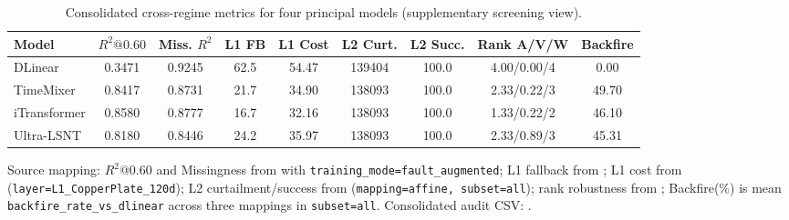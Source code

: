 ﻿\documentclass[review,1p,times]{elsarticle}
\begin{document}
\begin{table}[t]
\centering
\caption{Consolidated cross-regime metrics for four principal models (supplementary screening view).}
\label{tab:supp_decision_aware_robustness_summary}
\begingroup
\setlength{\tabcolsep}{3pt}
\scriptsize
\begin{tabular*}{\linewidth}{@{\extracolsep{\fill}}lcccccccc@{}}
\toprule
\textbf{Model} & \textbf{$R^2@0.60$} & \textbf{Miss. $R^2$} & \textbf{L1 FB} & \textbf{L1 Cost} & \textbf{L2 Curt.} & \textbf{L2 Succ.} & \textbf{Rank A/V/W} & \textbf{Backfire} \\
\midrule
DLinear & 0.3471 & 0.9245 & 62.5 & 54.47 & 139404 & 100.0 & 4.00/0.00/4 & 0.00 \\
TimeMixer & 0.8417 & 0.8731 & 21.7 & 34.90 & 138093 & 100.0 & 2.33/0.22/3 & 49.70 \\
iTransformer & 0.8580 & 0.8777 & 16.7 & 32.16 & 138093 & 100.0 & 1.33/0.22/2 & 46.10 \\
Ultra-LSNT & 0.8180 & 0.8446 & 24.2 & 35.97 & 138093 & 100.0 & 2.33/0.89/3 & 45.31 \\
\bottomrule
\end{tabular*}
\vspace{3pt}
\footnotesize Source mapping: $R^2@0.60$ and Missingness from  with \texttt{training\_mode=fault\_augmented}; L1 fallback from ; L1 cost from  (\texttt{layer=L1\_CopperPlate\_120d}); L2 curtailment/success from  (\texttt{mapping=affine, subset=all}); rank robustness from ; Backfire(\%) is mean \texttt{backfire\_rate\_vs\_dlinear} across three mappings in \texttt{subset=all}. Consolidated audit CSV: .
\endgroup
\end{table}
\end{document}
